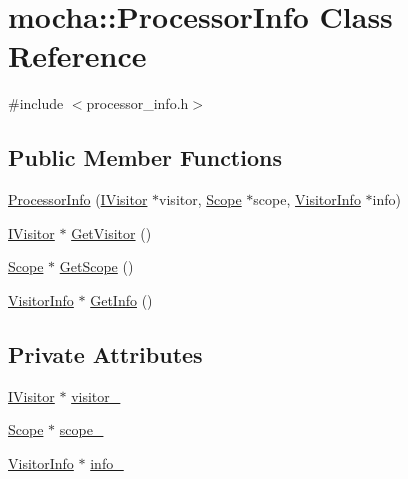 \hypertarget{classmocha_1_1_processor_info}{
\section{mocha::ProcessorInfo Class Reference}
\label{classmocha_1_1_processor_info}
}


{\ttfamily \#include $<$processor\_\-info.h$>$}

\subsection*{Public Member Functions}
\begin{DoxyCompactItemize}
\item 
\hyperlink{classmocha_1_1_processor_info_aeb70e5e456119087011a6519c6ddcf45}{ProcessorInfo} (\hyperlink{classmocha_1_1_i_visitor}{IVisitor} $\ast$visitor, \hyperlink{classmocha_1_1_scope}{Scope} $\ast$scope, \hyperlink{classmocha_1_1_visitor_info}{VisitorInfo} $\ast$info)
\item 
\hyperlink{classmocha_1_1_i_visitor}{IVisitor} $\ast$ \hyperlink{classmocha_1_1_processor_info_a49df50f044f059422912e453a4d863bb}{GetVisitor} ()
\item 
\hyperlink{classmocha_1_1_scope}{Scope} $\ast$ \hyperlink{classmocha_1_1_processor_info_a9889c559004221598092678cf1f3fff3}{GetScope} ()
\item 
\hyperlink{classmocha_1_1_visitor_info}{VisitorInfo} $\ast$ \hyperlink{classmocha_1_1_processor_info_ab6c1f1d981b047d0d4967da546402905}{GetInfo} ()
\end{DoxyCompactItemize}
\subsection*{Private Attributes}
\begin{DoxyCompactItemize}
\item 
\hyperlink{classmocha_1_1_i_visitor}{IVisitor} $\ast$ \hyperlink{classmocha_1_1_processor_info_a48154ca90d0975bd482629d5d738d224}{visitor\_\-}
\item 
\hyperlink{classmocha_1_1_scope}{Scope} $\ast$ \hyperlink{classmocha_1_1_processor_info_a8d20024f149113974c3c538bc503a569}{scope\_\-}
\item 
\hyperlink{classmocha_1_1_visitor_info}{VisitorInfo} $\ast$ \hyperlink{classmocha_1_1_processor_info_a85af50f9a40f79f2ef62028c175c2c32}{info\_\-}
\end{DoxyCompactItemize}


